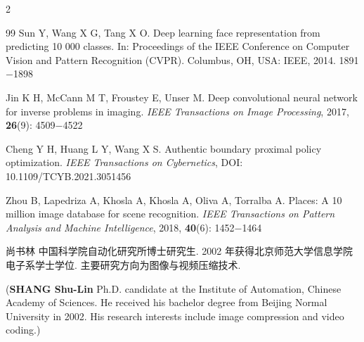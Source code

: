 \documentclass{aas}
\begin{document}
\begin{multicols*}{2}
\begin{thebibliography}{99}
   Sun Y, Wang X G, Tang X O. Deep learning face representation from predicting 10 000 classes. In: Proceedings of the IEEE Conference on Computer Vision and Pattern Recognition (CVPR). Columbus, OH, USA: IEEE, 2014. 1891$-$1898

   Jin K H, McCann M T, Froustey E, Unser M. Deep convolutional neural network for inverse problems in imaging. \textsl{IEEE Transactions on Image Processing}, 2017, \textbf{26}(9): 4509$-$4522



   Cheng Y H, Huang L Y, Wang X S. Authentic boundary proximal policy optimization. \textsl{IEEE Transactions on Cybernetics}, DOI: 10.1109/TCYB.2021.3051456

   Zhou B, Lapedriza A, Khosla A, Khosla A, Oliva A, Torralba A. Places: A 10 million image database for scene recognition. \textsl{IEEE Transactions on Pattern Analysis and Machine Intelligence}, 2018, \textbf{40}(6): 1452$-$1464
\end{thebibliography}

\begin{biography}
\noindent \textsf{尚书林}\quad
中国科学院自动化研究所博士研究生.
2002 年获得北京师范大学信息学院电子系学士学位.
主要研究方向为图像与视频压缩技术.\\

\noindent(\textbf{SHANG Shu-Lin}\quad
Ph.D. candidate at the
Institute of Automation, Chinese Academy of Sciences. He received
his bachelor degree from Beijing Normal University in 2002. His research
interests include image compression and video coding.)
\end{biography}


\end{multicols*}
\end{document}
